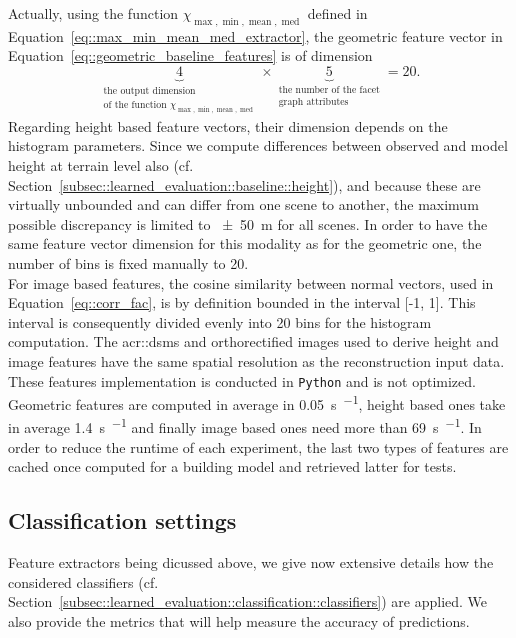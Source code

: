         Actually, using the function \(\chi_{\max,\min,\operatorname{mean},\operatorname{med}}\) defined in Equation~\ref{eq::max_min_mean_med_extractor}, the geometric feature vector in Equation~\ref{eq::geometric_baseline_features} is of dimension
        \begin{equation*}
            \underbrace{4}_{\substack{\text{the output dimension}\\\text{of the function } \chi_{\max,\min,\operatorname{mean},\operatorname{med}} }} \times \underbrace{5}_{\substack{\text{the number of the facet}\\\text{graph attributes}}} = 20.
        \end{equation*}
        Regarding height based feature vectors, their dimension depends on the histogram parameters.
        Since we compute differences between observed and model height at terrain level also (cf. Section~\ref{subsec::learned_evaluation::baseline::height}), and because these are virtually unbounded and can differ from one scene to another, the maximum possible discrepancy is limited to \SI{\pm 50}{\m} for all scenes.
        In order to have the same feature vector dimension for this modality as for the geometric one, the number of bins is fixed manually to \num{20}.\\
        For image based features, the cosine similarity between normal vectors, used in Equation~\ref{eq::corr_fac}, is by definition bounded in the interval [-1, 1].
        This interval is consequently divided evenly into \num{20} bins for the histogram computation.
        The \glspl{acr::dsm} and orthorectified images used to derive height and image features have the same spatial resolution as the reconstruction input data.\\

        These features implementation is conducted in \verb!Python! and is not optimized.
        Geometric features are computed in average in \SI{0.05}{\s \per \building}, height based ones take in average \SI{1.4}{\s \per \building} and finally image based ones need more than \SI{69}{\s \per \building}.
        In order to reduce the runtime of each experiment, the last two types of features are cached once computed for a building model and retrieved latter for tests.
    \subsection{Classification settings}
        \label{subsec::learned_evaluation::implementation::classification}
        Feature extractors being dicussed above, we give now extensive details how the considered classifiers (cf. Section~\ref{subsec::learned_evaluation::classification::classifiers}) are applied.
        We also provide the metrics that will help measure the accuracy of predictions.

